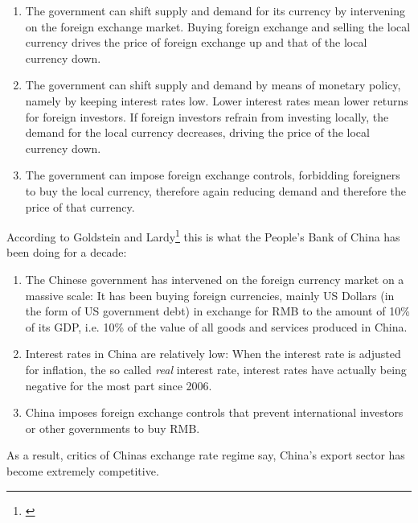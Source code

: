 \documentclass[11pt]{article}
\begin{document}
\begin{enumerate}
\item{The government can shift supply and demand for its currency by intervening on the foreign exchange market. Buying foreign exchange and selling the local currency drives the price of foreign exchange up and that of the local currency down.}
\item{The government can shift supply and demand by means of monetary policy, namely by keeping interest rates low. Lower interest rates mean lower returns for foreign investors. If foreign investors refrain from investing locally, the demand for the local currency decreases, driving the price of the local currency down.}
\item{The government can impose foreign exchange controls, forbidding foreigners to buy the local currency, therefore again reducing demand and therefore the price of that currency.}
\end{enumerate}

According to Goldstein and Lardy\footnote{\cite[pp.  
40]{GoldsteinLardy2008}}  this is what the People's Bank of China has been doing for a decade:

\begin{enumerate}
\item{The Chinese government has intervened on the foreign currency 
		market on a massive scale: It has been buying foreign 
		currencies, mainly US Dollars (in the form of US government 
		debt) in exchange for RMB to the amount of 10\% of its GDP, i.e. 
		10\% of the value of all goods and services produced in China.} 
\item{Interest rates in China are relatively low: When the interest rate is adjusted for inflation, the so called \emph{real} interest rate, interest rates have actually being negative for the most part since 2006.} %
\item{China imposes foreign exchange controls that prevent international investors or other governments to buy RMB.}%
\end{enumerate}

As a result, critics of Chinas exchange rate regime say, China's export sector has become extremely competitive. 
\end{document}
